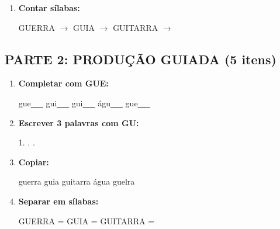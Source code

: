 \begin{exercicio}
\begin{enumerate}
  \item \textbf{Contar sílabas:}
  \begin{center}
  GUERRA $\rightarrow$ \underline{\hspace{0.9cm}} \quad GUIA $\rightarrow$ \underline{\hspace{0.9cm}} \quad GUITARRA $\rightarrow$ \underline{\hspace{0.9cm}}
  \end{center}

\end{enumerate}

\subsection*{PARTE 2: PRODUÇÃO GUIADA (5 itens)}

\begin{enumerate}[resume]

  \item \textbf{Completar com GUE:}
  \begin{center}
  gue\underline{~~~} \quad gui\underline{~~~} \quad gui\underline{~~~} \quad águ\underline{~~~} \quad gue\underline{~~~}
  \end{center}

  \item \textbf{Escrever 3 palavras com GU:}
  \begin{center}
  1. \underline{\hspace{3cm}} . \underline{\hspace{3cm}} . \underline{\hspace{3cm}}
  \end{center}

  \item \textbf{Copiar:}
  \begin{center}
  guerra \quad guia \quad guitarra \quad água \quad guelra
  \end{center}

  \item \textbf{Separar em sílabas:}
  \begin{center}
  GUERRA = \underline{\hspace{1cm}} \underline{\hspace{1cm}} \quad GUIA = \underline{\hspace{1cm}} \underline{\hspace{1cm}} \quad GUITARRA = \underline{\hspace{1cm}} \underline{\hspace{1cm}}
  \end{center}


\end{enumerate}
\end{exercicio}
